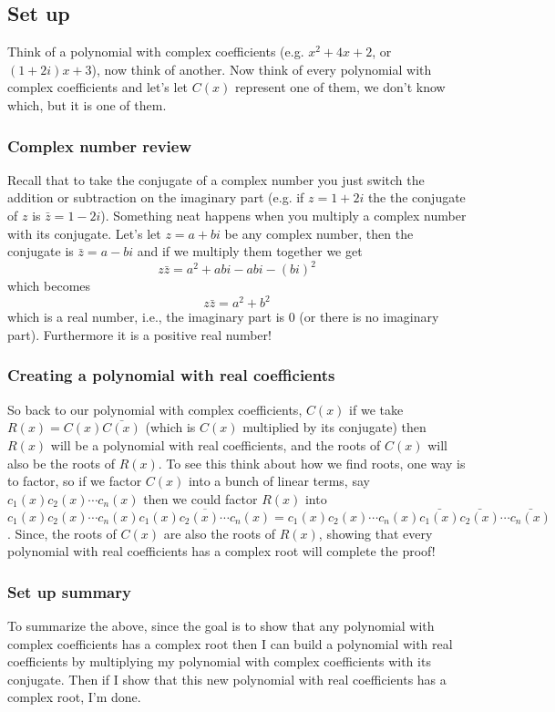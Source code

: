 \documentclass[12pt]{article}
\begin{document}
\subsection*{Set up}
Think of a polynomial with complex coefficients (e.g. $x^2+4x+2$, or $(1+2i)x+3$), now think of another.  Now think of every polynomial with complex coefficients and let's let $C(x)$ represent one of them, we don't know which, but it is one of them.\\

\subsubsection*{Complex number review}
Recall that to take the conjugate of a complex number you just switch the addition or subtraction on the imaginary part (e.g. if $z = 1+2i$ the the conjugate of $z$ is $\bar{z} = 1 - 2i$).  Something neat happens when you multiply a complex number with its conjugate. Let's let $z=a+bi$ be any complex number, then the conjugate is $\bar{z}=a-bi$ and if we multiply them together we get $$z\bar{z}=a^2+abi-abi-(bi)^2$$ 
which becomes 
$$z\bar{z}=a^2+b^2$$
 which is a real number, i.e., the imaginary part is 0 (or there is no imaginary part).  Furthermore it is a positive real number!\\

\subsubsection*{Creating a polynomial with real coefficients}
So back to our polynomial with complex coefficients, $C(x)$ if we take $R(x) = C(x) \bar{C(x)}$ (which is $C(x)$ multiplied by its conjugate) then $R(x)$ will be a polynomial with real coefficients, and the roots of $C(x)$ will also be the roots of $R(x)$.  To see this think about how we find roots, one way is to factor, so if we factor $C(x)$ into a bunch of linear terms, say $c_1(x)c_2(x)\cdots c_n(x)$ then we could factor $R(x)$ into $$c_1(x)c_2(x)\cdots c_n(x)\overline{c_1(x)c_2(x) \cdots c_n(x)}= c_1(x)c_2(x)\cdots c_n(x)\bar{c_1(x)} \bar{c_2(x)} \cdots \bar{c_n(x)}$$.  Since, the roots of $C(x)$ are also the roots of $R(x)$, showing that every polynomial with real coefficients has a complex root will complete the proof!


\subsubsection*{Set up summary}
To summarize the above, since the goal is to show that any polynomial with complex coefficients has a complex root then I can build a polynomial with real coefficients by multiplying my polynomial with complex coefficients with its conjugate.  Then if I show that this new polynomial with real coefficients has a complex root, I'm done.
\end{document}
